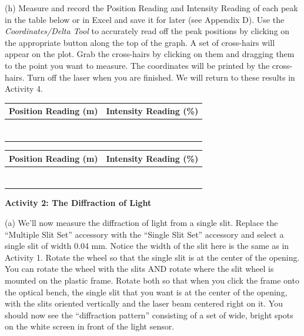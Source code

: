 (h) Measure and record the Position Reading and Intensity Reading
of each peak in the table below or in Excel and save it for later (see Appendix D).
Use the
{\it Coordinates/Delta Tool} to accurately read off the peak positions by clicking on the
appropriate button along the top of the graph. A set of cross-hairs will appear on the
plot. Grab the cross-hairs by clicking on them and dragging them to the point you want
to measure.
The coordinates will be printed by the cross-hairs.
Turn off the laser when you are finished.
We will return to these results in Activity 4.

\vspace{0.3cm}
{\centering \begin{tabular}{|c|c|}
\hline 
Position Reading (m)&
Intensity Reading (\%)\\
\hline
\hline 
&
\\
\hline 
&
\\
\hline 
&
\\
\hline 
&
\\
\hline 
&
\\
\hline 
&
\\
\hline 
&
\\
\hline 
\end{tabular}
\quad
\begin{tabular}{|c|c|}
\hline 
Position Reading (m)&
Intensity Reading (\%)\\
\hline
\hline 
&
\\
\hline 
&
\\
\hline 
&
\\
\hline 
&
\\
\hline 
&
\\
\hline 
&
\\
\hline 
&
\\
\hline 
\end{tabular}}
\vspace{0.3cm}


\textbf{Activity 2: The Diffraction of Light} 

(a) We'll now measure the diffraction of light from a single slit.
Replace the ``Multiple Slit Set'' accessory with the ``Single Slit Set'' accessory
and select a single slit of width 0.04 mm.
Notice the width of the slit here is the same as in Activity 1.
Rotate the wheel so that the single slit is at the center of the opening.
You can rotate the wheel with the slits AND rotate where the slit wheel is mounted
on the plastic frame. 
Rotate both so that when you click the frame onto the optical bench, the single slit that
you want is at the center of the opening, with the slits oriented vertically and the laser beam centered right on
it. You should now see the “diffraction pattern” consisting of a set of wide, bright spots 
on the white screen in front of the light sensor.

